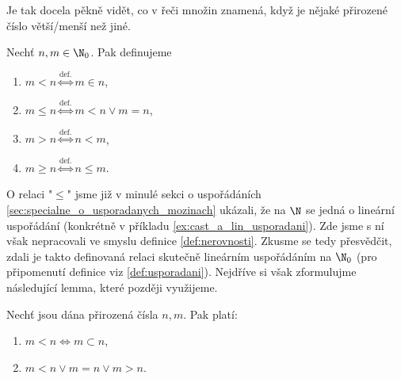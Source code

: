 Je tak docela pěkně vidět, co v řeči množin znamená, když je nějaké přirozené číslo větší/menší než jiné.
\begin{definition}\label{def:nerovnosti}
    Nechť $n,m\in\N_0$. Pak definujeme
    \begin{enumerate}[label=(\roman*)]
        \item $m<n\stackrel{\text{def.}}{\iff}m\in n$,
        \item $m\leq n\stackrel{\text{def.}}{\iff}m<n\lor m=n$,
        \item $m>n\stackrel{\text{def.}}{\iff}n<m$,
        \item $m\geq n\stackrel{\text{def.}}{\iff}n\leq m$.
    \end{enumerate}
\end{definition}
O relaci "$\leq$" jsme již v minulé sekci o uspořádáních \ref{sec:specialne_o_usporadanych_mozinach} ukázali, že na $\N$
se jedná o lineární uspořádání (konkrétně v příkladu \ref{ex:cast_a_lin_usporadani}). Zde jsme s ní však
nepracovali ve smyslu definice \ref{def:nerovnosti}. Zkusme se tedy přesvědčit, zdali je takto
definovaná relaci skutečně lineárním uspořádáním na $\N_0$ (pro připomenutí definice
viz \ref{def:usporadani}). Nejdříve si však zformulujme následující lemma, které později
využijeme.
\begin{lemma}\label{lem:vlastnosti_prirozenych_cisel_2}
    Nechť jsou dána přirozená čísla $n,m$. Pak platí:
    \begin{enumerate}[label=(\roman*)]
        \item\label{item:vlastnost_2_1} $m<n\iff m\subset n$,
        \item\label{item:vlastnost_2_2} $m<n \lor m=n \lor m>n$.
    \end{enumerate}
\end{lemma}
